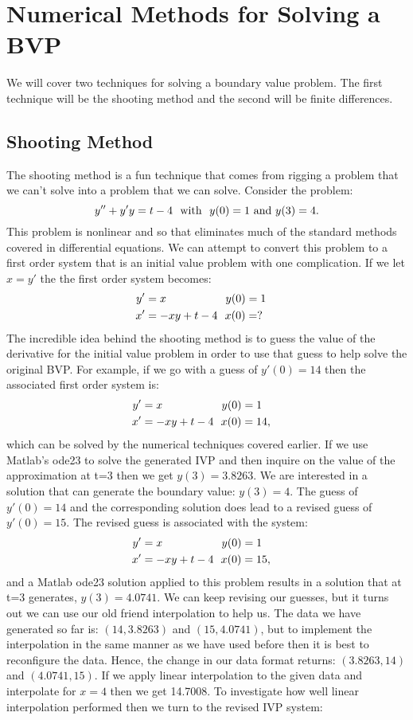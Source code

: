 \documentclass[twoside]{article}
\begin{document}
\section{Numerical Methods for Solving a BVP}
We will cover two techniques for solving a boundary value problem. The first technique will be the shooting method and the second will be finite differences. 

\subsection{Shooting Method}

The shooting method is a fun technique that comes from rigging a problem that we can't solve into a problem that we can solve. Consider the problem:
$$y'' + y'y = t-4 \ \ {\rm with} \ \ y(0)=1 \ {\rm and} \ y(3)=4.$$
This problem is nonlinear and so that eliminates much of the standard methods covered in differential equations. We can attempt to convert this problem to a first order system that is an initial value problem with one complication. If we let $x=y'$ the the first order system becomes:
\begin{align*}
    y' &= x \ \ \ \ \ \ \ \ \ \ \ \ \ \ \ \ y(0)=1 \cr
    x' &= -xy+t-4 \ \ x(0)=?
\end{align*}
The incredible idea behind the shooting method is to guess the value of the derivative for the initial value problem in order to use that guess to help solve the original BVP. For example, if we go with a guess of $y'(0)=14$ then the associated first order system is: 
\begin{align*}
    y' &= x \ \ \ \ \ \ \ \ \ \ \ \ \ \ \ \ y(0)=1 \cr
    x' &= -xy+t-4 \ \ x(0)=14,
\end{align*}
which can be solved by the numerical techniques covered earlier. If we use Matlab's ode23 to solve the generated IVP and then inquire on the value of the approximation at t=3 then we get $y(3)=3.8263$. We are interested in a solution that can generate the boundary value: $y(3)=4$. The guess of $y'(0)=14$ and the corresponding solution does lead to a revised guess of $y'(0)=15$. The revised guess is associated with the system:
\begin{align*}
    y' &= x \ \ \ \ \ \ \ \ \ \ \ \ \ \ \ \ y(0)=1 \cr
    x' &= -xy+t-4 \ \ x(0)=15,
\end{align*}
and a Matlab ode23 solution applied to this problem results in a solution that at t=3 generates, $y(3)=4.0741$. We can keep revising our guesses, but it turns out we can use our old friend interpolation to help us. The data we have generated so far is: $(14,3.8263)$ and $(15,4.0741)$, but to implement the interpolation in the same manner as we have used before then it is best to reconfigure the data. Hence, the change in our data format returns:  $(3.8263,14)$ and $(4.0741,15)$. If we apply linear interpolation to the given data and interpolate for $x=4$ then we get 14.7008. To investigate how well linear interpolation performed then we turn to the revised IVP system:
\end{document}
